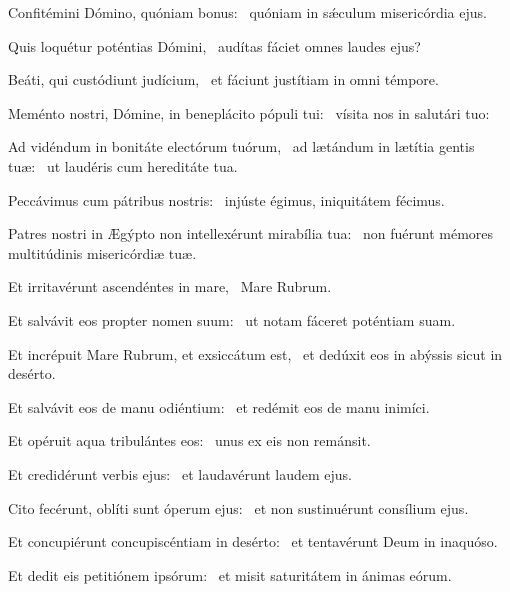 \item Confitémini Dómino, quóniam bonus:~\psstar{} quóniam in sǽculum misericórdia ejus.

\item Quis loquétur poténtias Dómini,~\psstar{} audítas fáciet omnes laudes ejus?

\item Beáti, qui custódiunt judícium,~\psstar{} et fáciunt justítiam in omni témpore.

\item Meménto nostri, Dómine, in beneplácito pópuli tui:~\psstar{} vísita nos in salutári tuo:

\item Ad vidéndum in bonitáte electórum tuórum,~\pscross{} ad lætándum in lætítia gentis tuæ:~\psstar{} ut laudéris cum hereditáte tua.

\item Peccávimus cum pátribus nostris:~\psstar{} injúste égimus, iniquitátem fécimus.

\item Patres nostri in Ægýpto non intellexérunt mirabília tua:~\psstar{} non fuérunt mémores multitúdinis misericórdiæ tuæ.

\item Et irritavérunt ascendéntes in mare,~\psstar{} Mare Rubrum.

\item Et salvávit eos propter nomen suum:~\psstar{} ut notam fáceret poténtiam suam.

\item Et incrépuit Mare Rubrum, et exsiccátum est,~\psstar{} et dedúxit eos in abýssis sicut in desérto.

\item Et salvávit eos de manu odiéntium:~\psstar{} et redémit eos de manu inimíci.

\item Et opéruit aqua tribulántes eos:~\psstar{} unus ex eis non remánsit.

\item Et credidérunt verbis ejus:~\psstar{} et laudavérunt laudem ejus.

\item Cito fecérunt, oblíti sunt óperum ejus:~\psstar{} et non sustinuérunt consílium ejus.

\item Et concupiérunt concupiscéntiam in desérto:~\psstar{} et tentavérunt Deum in inaquóso.

\item Et dedit eis petitiónem ipsórum:~\psstar{} et misit saturitátem in ánimas eórum.
